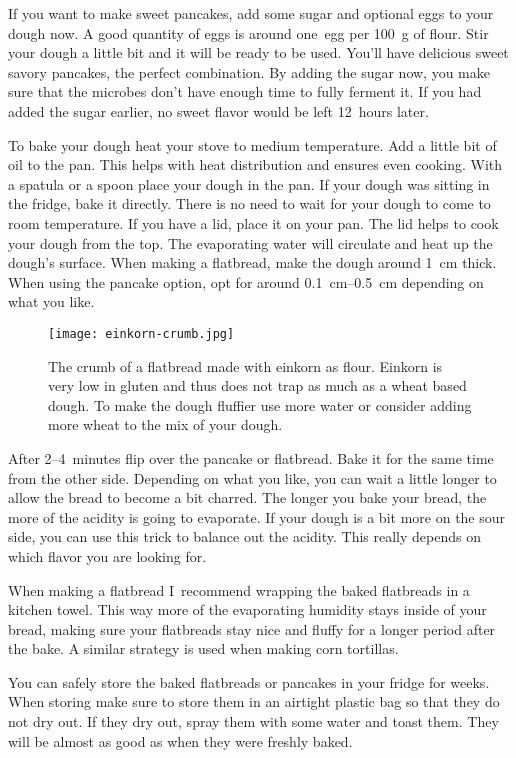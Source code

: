If you want to make sweet pancakes, add some sugar and optional eggs to your dough
now. A good quantity of eggs is around one~egg per \qty{100}{\gram} of flour.
Stir your dough a little bit and it will be ready to be used. You'll
have delicious sweet savory pancakes, the perfect combination. By
adding the sugar now, you make sure that the microbes don't have
enough time to fully ferment it. If you had added the sugar
earlier, no sweet flavor would be left  12~hours later.

To bake your dough heat your stove to medium temperature. Add a little bit of
oil to the pan. This helps with heat distribution and ensures even cooking.
With a spatula or a spoon place your dough in the pan. If your dough
was sitting in the fridge, bake it directly. There is no need to wait for your
dough to come to room temperature. If you have a lid,
place it on your pan. The lid helps to cook your dough from the top.
The evaporating water will circulate and heat up the dough's surface. When
making a flatbread, make the dough around \qty{1}{\cm} thick. When using the
pancake option, opt for around \qtyrange{0.1}{0.5}{\cm} depending on what you
like.

\begin{figure}[htb]
\centering
  \texttt{[image: einkorn-crumb.jpg]}
  \caption[Einkorn crum]{The crumb of a flatbread made with einkorn as flour.
      Einkorn is very low in gluten and thus does not trap as much  as
      a wheat based dough. To make the dough fluffier use more water or
      consider adding more wheat to the mix of your dough.}
\end{figure}

After 2--4~minutes flip over the pancake or flatbread. Bake it for the same
time from the other side. Depending on what you like, you can wait a little
longer to allow the bread to become a bit charred. The longer you
bake your bread, the more of the acidity is going to evaporate. If your
dough is a bit more on the sour side, you can use this trick to balance
out the acidity. This really depends on which flavor you are looking for.

When making a flatbread I~recommend wrapping the baked flatbreads in a kitchen
towel. This way more of the evaporating humidity stays inside of your bread,
making sure your flatbreads stay nice and fluffy for a longer period after the
bake. A similar strategy is used when making corn tortillas.

You can safely store the baked flatbreads or pancakes in your fridge
for weeks. When storing make sure to store them in an airtight plastic bag so that
they do not dry out. If they dry out, spray them with some water and toast them.
They will be almost as good as when they were freshly baked.

